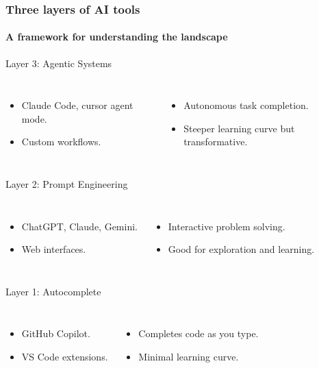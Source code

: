 \documentclass[aspectratio=169]{beamer}
\begin{document}
\begin{frame}
    \frametitle{Three layers of AI tools}
    \framesubtitle{A framework for understanding the landscape}
    \begin{block}{Layer 3: Agentic Systems}
        \begin{columns}
            \begin{itemize}
                \item Claude Code, cursor agent mode.
                \item Custom workflows.
            \end{itemize}
            \begin{itemize}
                \item Autonomous task completion.
                \item Steeper learning curve but transformative.
            \end{itemize}
        \end{columns}
    \end{block}
    
    \begin{block}{Layer 2: Prompt Engineering}
        \begin{columns}
            \begin{itemize}
                \item ChatGPT, Claude, Gemini.
                \item Web interfaces.
            \end{itemize}
            \begin{itemize}
                \item Interactive problem solving.
                \item Good for exploration and learning.
            \end{itemize}
        \end{columns}
    \end{block}
    
    \begin{block}{Layer 1: Autocomplete}
        \begin{columns}
            \begin{itemize}
                \item GitHub Copilot.
                \item VS Code extensions.
            \end{itemize}
            \begin{itemize}
                \item Completes code as you type.
                \item Minimal learning curve.
            \end{itemize}
        \end{columns}
    \end{block}
\end{frame}
\end{document}

